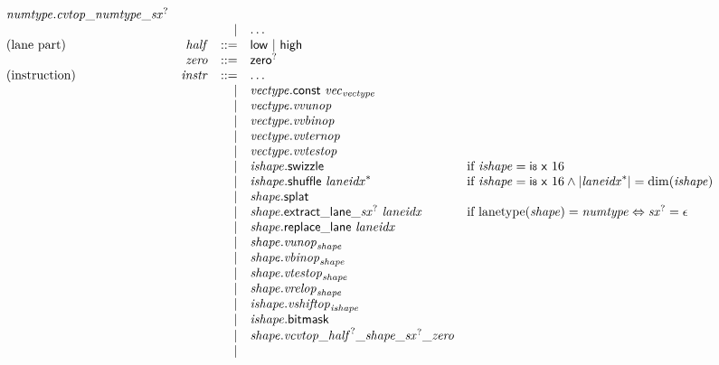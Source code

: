 $$\begin{array}{@{}lrrl@{}l@{}}
{\mathit{numtype}} . {{{{{\mathit{cvtop}}}{\mathsf{\_}}}{{\mathit{numtype}}}}{\mathsf{\_}}}{{{\mathit{sx}}^?}} \\ &&|&
\dots \\
\mbox{(lane part)} & {\mathit{half}} &::=& \mathsf{low} ~|~ \mathsf{high} \\
& {\mathit{zero}} &::=& {\mathsf{zero}^?} \\
\mbox{(instruction)} & {\mathit{instr}} &::=& \dots \\ &&|&
{\mathit{vectype}}.\mathsf{const}~{{\mathit{vec}}}_{{\mathit{vectype}}} \\ &&|&
{\mathit{vectype}} . {\mathit{vvunop}} \\ &&|&
{\mathit{vectype}} . {\mathit{vvbinop}} \\ &&|&
{\mathit{vectype}} . {\mathit{vvternop}} \\ &&|&
{\mathit{vectype}} . {\mathit{vvtestop}} \\ &&|&
{\mathit{ishape}}.\mathsf{swizzle} &\quad
  \mbox{if}~{\mathit{ishape}} = \mathsf{i{\scriptstyle8}}~\mathsf{x}~16 \\ &&|&
{\mathit{ishape}}.\mathsf{shuffle}~{{\mathit{laneidx}}^\ast} &\quad
  \mbox{if}~{\mathit{ishape}} = \mathsf{i{\scriptstyle8}}~\mathsf{x}~16 \land {|{{\mathit{laneidx}}^\ast}|} = {\mathrm{dim}}({\mathit{ishape}}) \\ &&|&
{\mathit{shape}}.\mathsf{splat} \\ &&|&
{{\mathit{shape}}.\mathsf{extract\_lane\_}}{{{\mathit{sx}}^?}}~{\mathit{laneidx}} &\quad
  \mbox{if}~{\mathrm{lanetype}}({\mathit{shape}}) = {\mathit{numtype}} \Leftrightarrow {{\mathit{sx}}^?} = \epsilon \\ &&|&
{\mathit{shape}}.\mathsf{replace\_lane}~{\mathit{laneidx}} \\ &&|&
{\mathit{shape}} . {{\mathit{vunop}}}_{{\mathit{shape}}} \\ &&|&
{\mathit{shape}} . {{\mathit{vbinop}}}_{{\mathit{shape}}} \\ &&|&
{\mathit{shape}} . {{\mathit{vtestop}}}_{{\mathit{shape}}} \\ &&|&
{\mathit{shape}} . {{\mathit{vrelop}}}_{{\mathit{shape}}} \\ &&|&
{\mathit{ishape}} . {{\mathit{vshiftop}}}_{{\mathit{ishape}}} \\ &&|&
{\mathit{ishape}}.\mathsf{bitmask} \\ &&|&
{\mathit{shape}} . {{{{{{{{{\mathit{vcvtop}}}{\mathsf{\_}}}{{{\mathit{half}}^?}}}{\mathsf{\_}}}{{\mathit{shape}}}}{\mathsf{\_}}}{{{\mathit{sx}}^?}}}{\mathsf{\_}}}{{\mathit{zero}}} \\ &&|&

\end{array}$$
